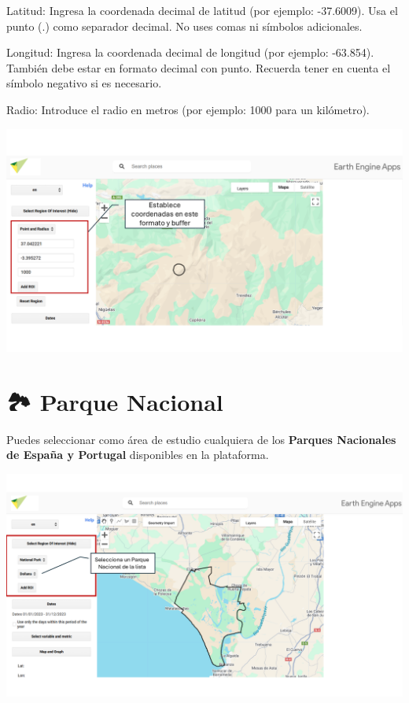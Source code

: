 \documentclass[
]{book}
\begin{document}
Latitud: Ingresa la coordenada decimal de latitud (por ejemplo: -37.6009).
Usa el punto (.) como separador decimal. No uses comas ni símbolos adicionales.

Longitud: Ingresa la coordenada decimal de longitud (por ejemplo: -63.854).
También debe estar en formato decimal con punto. Recuerda tener en cuenta el símbolo negativo si es necesario.

Radio: Introduce el radio en metros (por ejemplo: 1000 para un kilómetro).

\includegraphics{assets/buffer_es1.png}

\section{\texorpdfstring{\textbf{🏞️ Parque Nacional}}{🏞️ Parque Nacional}}\label{parque-nacional}

Puedes seleccionar como área de estudio cualquiera de los \textbf{Parques Nacionales de España y Portugal} disponibles en la plataforma.

\includegraphics{assets/np_es.png}
\end{document}
